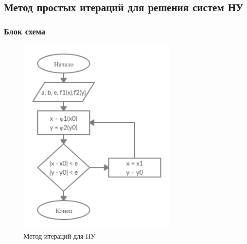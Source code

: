 \documentclass[11pt, english]{article}
\begin{document}
\subsection{Метод простых итераций для решения систем НУ}
\subsubsection{Блок схема}
\begin{figure}[h!]
    \centering
    \includegraphics[width=8cm]{schema-3.jpg}
    \caption{Метод итераций для НУ}
    \label{fig:my_label}
\end{figure}
\newpage
\end{document}
